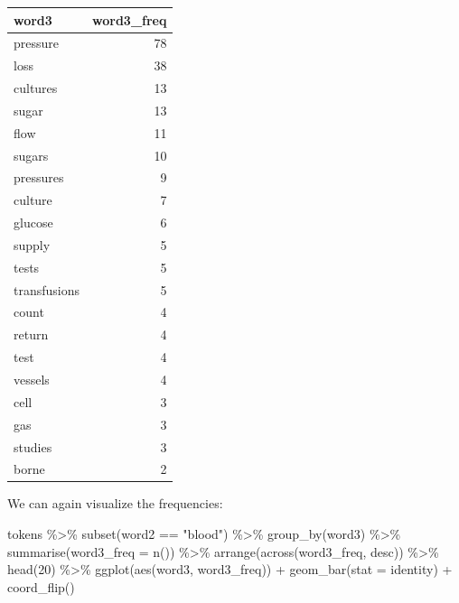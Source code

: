 \documentclass[
]{article}
\newenvironment{Shaded}{\begin{snugshade}}{\end{snugshade}}
\newcommand{\AttributeTok}[1]{\textcolor[rgb]{0.77,0.63,0.00}{#1}}
\newcommand{\DecValTok}[1]{\textcolor[rgb]{0.00,0.00,0.81}{#1}}
\newcommand{\FunctionTok}[1]{\textcolor[rgb]{0.00,0.00,0.00}{#1}}
\newcommand{\NormalTok}[1]{#1}
\newcommand{\SpecialCharTok}[1]{\textcolor[rgb]{0.00,0.00,0.00}{#1}}
\newcommand{\StringTok}[1]{\textcolor[rgb]{0.31,0.60,0.02}{#1}}
\begin{document}
\begin{table}
\centering
\begin{tabular}{l|r}
\hline
word3 & word3\_freq\\
\hline
pressure & 78\\
\hline
loss & 38\\
\hline
cultures & 13\\
\hline
sugar & 13\\
\hline
flow & 11\\
\hline
sugars & 10\\
\hline
pressures & 9\\
\hline
culture & 7\\
\hline
glucose & 6\\
\hline
supply & 5\\
\hline
tests & 5\\
\hline
transfusions & 5\\
\hline
count & 4\\
\hline
return & 4\\
\hline
test & 4\\
\hline
vessels & 4\\
\hline
cell & 3\\
\hline
gas & 3\\
\hline
studies & 3\\
\hline
borne & 2\\
\hline
\end{tabular}
\end{table}

We can again visualize the frequencies:

\begin{Shaded}
\begin{Highlighting}[]
\NormalTok{tokens }\SpecialCharTok{\%\textgreater{}\%}
  \FunctionTok{subset}\NormalTok{(word2 }\SpecialCharTok{==} \StringTok{"blood"}\NormalTok{) }\SpecialCharTok{\%\textgreater{}\%}
  \FunctionTok{group\_by}\NormalTok{(word3) }\SpecialCharTok{\%\textgreater{}\%}
  \FunctionTok{summarise}\NormalTok{(}\AttributeTok{word3\_freq =} \FunctionTok{n}\NormalTok{()) }\SpecialCharTok{\%\textgreater{}\%}
  \FunctionTok{arrange}\NormalTok{(}\FunctionTok{across}\NormalTok{(word3\_freq, desc)) }\SpecialCharTok{\%\textgreater{}\%}
  \FunctionTok{head}\NormalTok{(}\DecValTok{20}\NormalTok{) }\SpecialCharTok{\%\textgreater{}\%}
  \FunctionTok{ggplot}\NormalTok{(}\FunctionTok{aes}\NormalTok{(word3, word3\_freq)) }\SpecialCharTok{+}
  \FunctionTok{geom\_bar}\NormalTok{(}\AttributeTok{stat =} \StringTok{\textquotesingle{}identity\textquotesingle{}}\NormalTok{) }\SpecialCharTok{+}
  \FunctionTok{coord\_flip}\NormalTok{()}
\end{Highlighting}
\end{Shaded}
\end{document}
